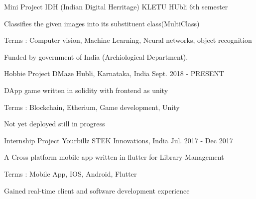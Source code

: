 


\begin{cventries}


\cventry
{Mini Project} %
{IDH (Indian Digital Herritage)} %
{KLETU HUbli} %
{6th semester} %
{ %
\begin{cvitems}
\item {Classifies the given images into its substituent class(MultiClass)}
\item {Terms : Computer vision, Machine Learning, Neural networks, object recognition}
\item {Funded by government of India  (Archiological Department).}
\end{cvitems}
}


\cventry
{Hobbie Project} %
{DMaze} %
{Hubli, Karnataka, India} %
{Sept. 2018 - PRESENT} %
{ %
\begin{cvitems}
\item {DApp game written in solidity with frontend as unity}
\item {Terms : Blockchain, Etherium, Game development, Unity}
\item {Not yet deployed still in progress}
\end{cvitems}
}


\cventry
{Internship Project} %
{Yourbillz} %
{STEK Innovations, India} %
{Jul. 2017 - Dec 2017} %
{ %
\begin{cvitems}
\item {A Cross platform mobile app written in flutter for Library Management}
\item {Terms : Mobile App, IOS, Android, Flutter}
\item {Gained real-time client and software development experience}
\end{cvitems}
}


\end{cventries}
